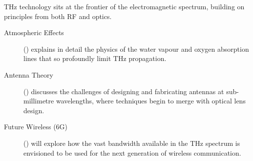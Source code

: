 \begin{importantbox}[title={Further Reading}]
    THz technology sits at the frontier of the electromagnetic spectrum, building on principles from both RF and optics.
    \begin{description}
        \item[Atmospheric Effects] () explains in detail the physics of the water vapour and oxygen absorption lines that so profoundly limit THz propagation.
        \item[Antenna Theory] () discusses the challenges of designing and fabricating antennas at sub-millimetre wavelengths, where techniques begin to merge with optical lens design.
        \item[Future Wireless (6G)] () will explore how the vast bandwidth available in the THz spectrum is envisioned to be used for the next generation of wireless communication.
    \end{description}
\end{importantbox}